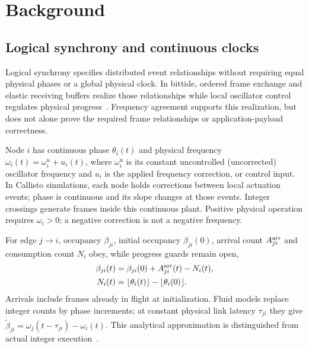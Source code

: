\section{Background}
\label{sec:background}

\subsection{Logical synchrony and continuous clocks}
Logical synchrony specifies distributed event relationships without
requiring equal physical phases or a global physical clock.
In bittide, ordered frame exchange and elastic receiving buffers
realize those relationships while local oscillator control regulates
physical progress~\cite{lall2024logicalSynchrony}. Frequency agreement
supports this realization, but does not alone prove the required
frame relationships or application-payload correctness.

Node $i$ has continuous phase $\theta_i(t)$ and physical frequency
$\omega_i(t)=\omega_i^u+u_i(t)$, where $\omega_i^u$ is its constant
uncontrolled (uncorrected) oscillator frequency and $u_i$ is the
applied frequency correction, or control input. In Callisto simulations, each node holds corrections between local actuation events; phase is continuous
and its slope changes at those events. Integer crossings generate
frames inside this continuous plant. Positive physical operation
requires $\omega_i>0$; a negative correction is not a negative frequency.

For edge $j\to i$, occupancy $\beta_{ji}$, initial occupancy
$\beta_{ji}(0)$, arrival count $A_{ji}^{\rm arr}$ and consumption
count $N_i$ obey, while progress guards remain open,
\begin{align}
 \beta_{ji}(t)&=\beta_{ji}(0)+A_{ji}^{\rm arr}(t)-N_i(t),\nonumber\\
 N_i(t)&=\lfloor\theta_i(t)\rfloor-\lfloor\theta_i(0)\rfloor.
 \label{eq:bg_count_balance}
\end{align}
Arrivals include frames already in flight at initialization. Fluid
models replace integer counts by phase increments; at constant physical
link latency $\tau_{ji}$ they give
$\dot{\widetilde\beta}_{ji}=\omega_j(t-\tau_{ji})-\omega_i(t)$.
This analytical approximation is distinguished from actual integer
execution~\cite{lall2022resistance,lall2024bufferOccupancy}.

